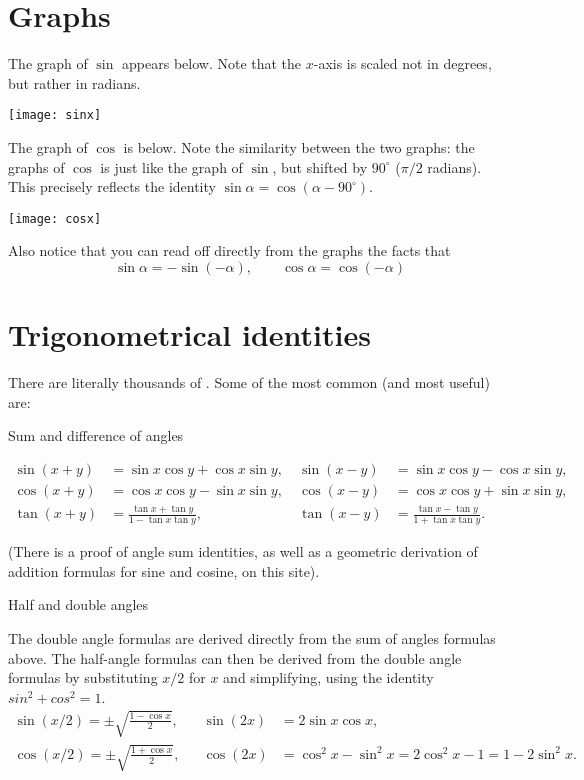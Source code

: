 \documentclass[12pt]{article}
\begin{document}
\section{Graphs}
The graph of $\sin$ appears below. Note that the $x$-axis is scaled not in degrees, but rather in radians.
\begin{center}
\texttt{[image: sinx]}
\end{center}

The graph of $\cos$ is below. Note the similarity between the two graphs: the graphs of $\cos$ is just like the graph of $\sin$, but shifted by $90^\circ$ ($\pi/2$ radians). This precisely reflects the identity $\sin \alpha = \cos (\alpha-90^\circ)$.
\begin{center}
\texttt{[image: cosx]}
\end{center}

Also notice that you can read off directly from the graphs the facts that
$$\sin\alpha=-\sin(-\alpha),\qquad\cos\alpha=\cos(-\alpha)$$
\section{Trigonometrical identities}

There are literally thousands of . Some of the most common (and most useful) are:

Sum and difference of angles

\begin{align*}
\sin(x+y) &= \sin x\cos y + \cos x \sin y,&\  \sin(x-y)& = \sin x\cos y - \cos x \sin y, \\
\cos(x+y) &= \cos x\cos y - \sin x \sin y,&\ \cos(x-y)& = \cos x\cos y + \sin x \sin y,\\
\tan(x+y)  &= \frac{\tan x + \tan y}{1-\tan x\tan y},&\  \tan(x-y)&  = \frac{\tan x - \tan y}{1+\tan x\tan y}.
\end{align*}

(There is a proof of angle sum identities, as well as a geometric derivation of addition formulas for sine and cosine, on this site).

Half and double angles

The double angle formulas are derived directly from the sum of angles formulas above. The half-angle formulas can then be derived from the double angle formulas by substituting $x/2$ for $x$ and simplifying, using the identity $sin^2+cos^2=1$.
\begin{align*}
 \sin(x/2) = \pm\sqrt{\frac{1-\cos x }{2}}, && \sin(2x) &= 2\sin x \cos x,\\
 \cos(x/2)= \pm\sqrt{\frac{1+\cos x}{2}},&&\cos(2x) &= \cos^2 x - \sin^2 x = 2\cos^2 x -1 = 1-2\sin^2 x.
\end{align*}
\end{document}
